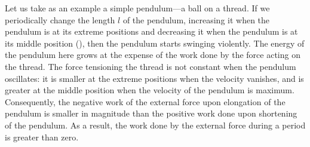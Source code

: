 Let us take as an example a simple pendulum---a ball on a thread. If we periodically change the length $l$ of the pendulum, increasing it when the pendulum is at its extreme positions and decreasing it when the pendulum is at its middle position (), then the pendulum starts swinging violently. The energy of the pendulum here grows at the expense of the work done by the force acting on the thread. The force tensioning the thread is not constant when the pendulum oscillates: it is smaller at the extreme positions when the velocity vanishes, and is greater at the middle position when the velocity of the pendulum is maximum. Consequently, the negative work of the external force upon elongation of the pendulum is smaller in magnitude than the positive work done upon shortening of the pendulum. As a result, the work done by the external force during a period is greater than zero.
